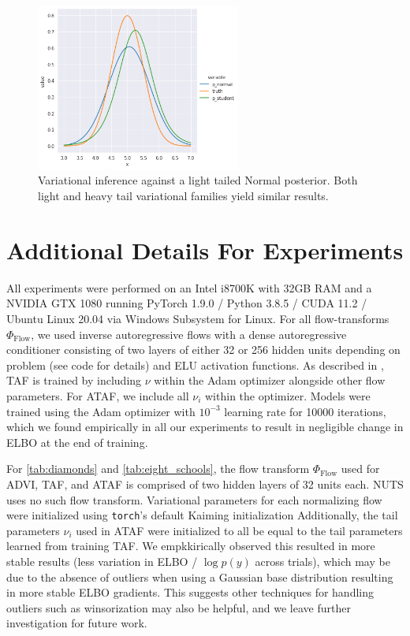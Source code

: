 \documentclass[nohyperref]{article}
\theoremstyle{plain}
\theoremstyle{definition}
\theoremstyle{remark}
\begin{document}
\begin{figure}[H]
  \centering
  \includegraphics[width=0.6\textwidth]{../Figures/normal_normal_posterior.png}
  \caption{Variational inference against a light tailed Normal posterior. Both light and heavy tail
  variational families yield similar results.}
  \label{fig:normal_normal}
\end{figure}


\section{Additional Details For Experiments}
\label{sec:additional-exp-details}

All experiments were performed on an Intel i8700K with 32GB RAM and a NVIDIA GTX 1080
running PyTorch 1.9.0 / Python 3.8.5 / CUDA 11.2 / Ubuntu Linux 20.04 via Windows Subsystem for Linux.
For all flow-transforms $\Phi_{\text{Flow}}$, we used inverse autoregressive flows \citep{kingma2016improved} with a
dense autoregressive conditioner consisting of two layers of either 32 or 256 hidden units depending on problem (see code for details) and
ELU activation functions.
As described in \citet{jaini2020tails}, TAF is trained by including $\nu$ within the Adam optimizer alongside other flow parameters. For ATAF, we include all $\nu_i$ within the optimizer.
Models were trained using the Adam optimizer with $10^{-3}$ learning rate
for 10000 iterations, which we found empirically in all our experiments to result in negligible change in ELBO
at the end of training.

For \cref{tab:diamonds} and \cref{tab:eight_schools}, the flow transform $\Phi_{\text{Flow}}$ used for ADVI, TAF, and ATAF
is comprised of two hidden layers of 32 units each. NUTS uses no such flow transform. Variational parameters for each normalizing flow were initialized
using \texttt{torch}'s default Kaiming initialization \citep{he2015delving} Additionally, the tail parameters $\nu_i$
used in ATAF were initialized to all be equal to the tail parameters learned from training TAF. We empkkirically observed
this resulted in more stable results (less variation in ELBO / $\log p(y)$ across trials), which may be due to
the absence of outliers when using a Gaussian base distribution resulting in more stable ELBO gradients. This suggests
other techniques for handling outliers such as winsorization may also be helpful, and we leave further investigation
for future work.
\end{document}
